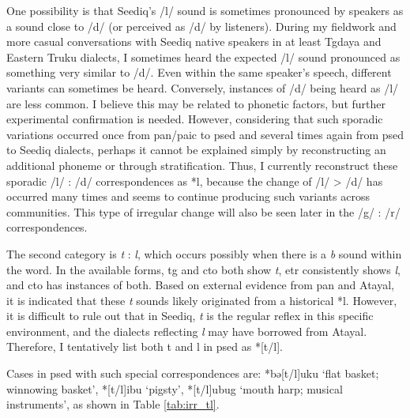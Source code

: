 One possibility is that Seediq's /l/ sound is sometimes pronounced by speakers as a sound close to /d/ (or perceived as /d/ by listeners). During my fieldwork and more casual conversations with Seediq native speakers in at least Tgdaya and Eastern Truku dialects, I sometimes heard the expected /l/ sound pronounced as something very similar to /d/. Even within the same speaker's speech, different variants can sometimes be heard. Conversely, instances of /d/ being heard as /l/ are less common. I believe this may be related to phonetic factors, but further experimental confirmation is needed. However, considering that such sporadic variations occurred once from \acl{pan}/\acl{paic} to \acl{psed} and several times again from \acl{psed} to Seediq dialects, perhaps it cannot be explained simply by reconstructing an additional phoneme or through stratification. Thus, I currently reconstruct these sporadic /l/ : /d/ correspondences as *l, because the change of /l/ > /d/ has occurred many times and seems to continue producing such variants across communities. This type of irregular change will also be seen later in the /g/ : /r/ correspondences.

The second category is \textit{t} : \textit{l}, which occurs possibly when there is a \textit{b} sound within the word. In the available forms, \acl{tg} and \acl{cto} both show \textit{t}, \acl{etr} consistently shows \textit{l}, and \acl{cto} has instances of both. Based on external evidence from \acl{pan} and Atayal, it is indicated that these \textit{t} sounds likely originated from a historical *l. However, it is difficult to rule out that in Seediq, \textit{t} is the regular reflex in this specific environment, and the dialects reflecting \textit{l} may have borrowed from Atayal. Therefore, I tentatively list both t and l in \acl{psed} as *[t/l].

Cases in \acl{psed} with such special correspondences are: *bə[t/l]uku `flat basket; winnowing basket', *[t/l]ibu `pigsty', *[t/l]ubug `mouth harp; musical instruments', as shown in Table \ref{tab:irr_tl}.

